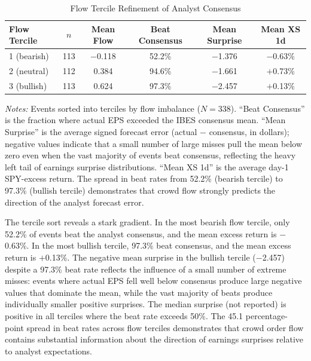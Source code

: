 \documentclass[11pt]{article}
\begin{document}
\begin{table}[htbp]
\centering
\begin{threeparttable}
\caption{Flow Tercile Refinement of Analyst Consensus}
\label{tab:refinement}
\begin{tabular}{lccccc}
\toprule
Flow Tercile & $n$ & Mean Flow & Beat Consensus & Mean Surprise & Mean XS 1d \\
\midrule
1 (bearish) & 113 & $-$0.118 & 52.2\% & $-$1.376 & $-$0.63\% \\
2 (neutral) & 112 & 0.384 & 94.6\% & $-$1.661 & $+$0.73\% \\
3 (bullish) & 113 & 0.624 & 97.3\% & $-$2.457 & $+$0.13\% \\
\bottomrule
\end{tabular}
\begin{tablenotes}
\small
\item \textit{Notes:} Events sorted into terciles by flow imbalance ($N = 338$). ``Beat Consensus'' is the fraction where actual EPS exceeded the IBES consensus mean. ``Mean Surprise'' is the average signed forecast error (actual $-$ consensus, in dollars); negative values indicate that a small number of large misses pull the mean below zero even when the vast majority of events beat consensus, reflecting the heavy left tail of earnings surprise distributions. ``Mean XS 1d'' is the average day-1 SPY-excess return. The spread in beat rates from 52.2\% (bearish tercile) to 97.3\% (bullish tercile) demonstrates that crowd flow strongly predicts the direction of the analyst forecast error.
\end{tablenotes}
\end{threeparttable}
\end{table}

The tercile sort reveals a stark gradient. In the most bearish flow tercile, only 52.2\% of events beat the analyst consensus, and the mean excess return is $-$0.63\%. In the most bullish tercile, 97.3\% beat consensus, and the mean excess return is $+$0.13\%. The negative mean surprise in the bullish tercile ($-$2.457) despite a 97.3\% beat rate reflects the influence of a small number of extreme misses: events where actual EPS fell well below consensus produce large negative values that dominate the mean, while the vast majority of beats produce individually smaller positive surprises. The median surprise (not reported) is positive in all terciles where the beat rate exceeds 50\%. The 45.1 percentage-point spread in beat rates across flow terciles demonstrates that crowd order flow contains substantial information about the direction of earnings surprises relative to analyst expectations.
\end{document}
